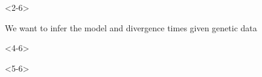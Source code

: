 \begin{frame}[t,label=fullmodel]
    \vspace{-1mm}

    \begin{minipage}[t][0.45\textheight][t]{\linewidth}
        \begin{onlyenv}<2-6>
            \begin{center}
                We want to infer the model and divergence times given genetic data
            \end{center}
        \end{onlyenv}

        \vspace{-3mm}
        \begin{onlyenv}<4-6>
            \begin{displaybox}[0.60\linewidth]
                \vspace{-1.3mm}

                \vspace{-5mm}

            \end{displaybox}
        \end{onlyenv}

        \vspace{0.5mm}
        \begin{onlyenv}<5-6>
            \begin{displaybox}[0.60\linewidth]
                \vspace{-4.1mm}



\end{displaybox}
\end{onlyenv}
\end{minipage}
\end{frame}
